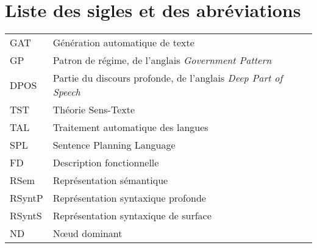 \cleardoublepage
{}  %
\tableofcontents				%
\cleardoublepage
{}
\listoftables
\cleardoublepage
{}
\listoffigures	



\chapter*{Liste des sigles et des abréviations}
\begingroup %
\renewcommand{\arraystretch}{2} 
\noindent\begin{tabular}{p{} p{}}
  GAT & Génération automatique de texte \\
  GP & Patron de régime, de l'anglais \textit{Government Pattern}\\
  DPOS  &  Partie du discours profonde, de l'anglais \textit{Deep Part of Speech}\\
  TST & Théorie Sens-Texte\\
	TAL & Traitement automatique des langues\\
	SPL & Sentence Planning Language \\
	FD & Description fonctionnelle \\
	RSem & Représentation sémantique \\
	RSyntP & Représentation syntaxique profonde \\
	RSyntS & Représentation syntaxique de surface \\
	ND & N\oe{}ud dominant \\
	
\end{tabular}
\endgroup  %


